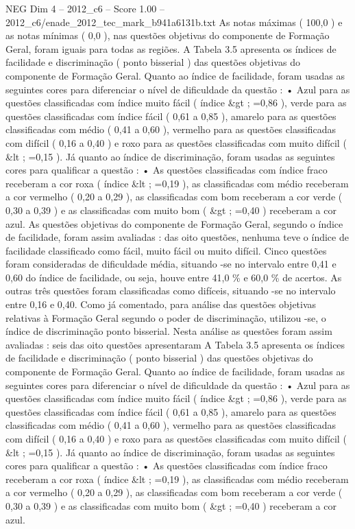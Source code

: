 \begin{textsample}{NEG Dim 4 – 2012\_c6 – Score 1.00 – 2012\_c6/enade\_2012\_tec\_mark\_b941a6131b.txt}
As notas máximas ( 100,0 ) e as notas mínimas ( 0,0 ), nas questões objetivas do componente de Formação Geral, foram iguais para todas as regiões.
A Tabela 3.5 apresenta os índices de facilidade e discriminação ( ponto bisserial ) das questões objetivas do componente de Formação Geral.
Quanto ao índice de facilidade, foram usadas as seguintes cores para diferenciar o nível de dificuldade da questão : • Azul para as questões classificadas com índice muito fácil ( índice \&gt ; =0,86 ), verde para as questões classificadas com índice fácil ( 0,61 a 0,85 ), amarelo para as questões classificadas com médio ( 0,41 a 0,60 ), vermelho para as questões classificadas com difícil ( 0,16 a 0,40 ) e roxo para as questões classificadas com muito difícil ( \&lt ; =0,15 ).
Já quanto ao índice de discriminação, foram usadas as seguintes cores para qualificar a questão : • As questões classificadas com índice fraco receberam a cor roxa ( índice \&lt ; =0,19 ), as classificadas com médio receberam a cor vermelho ( 0,20 a 0,29 ), as classificadas com bom receberam a cor verde ( 0,30 a 0,39 ) e as classificadas com muito bom ( \&gt ; =0,40 ) receberam a cor azul.
As questões objetivas do componente de Formação Geral, segundo o índice de facilidade, foram assim avaliadas : das oito questões, nenhuma teve o índice de facilidade classificado como fácil, muito fácil ou muito difícil.
Cinco questões foram consideradas de dificuldade média, situando -se no intervalo entre 0,41 e 0,60 do índice de facilidade, ou seja, houve entre 41,0 \% e 60,0 \% de acertos.
As outras três questões foram classificadas como difíceis, situando -se no intervalo entre 0,16 e 0,40.
Como já comentado, para análise das questões objetivas relativas à Formação Geral segundo o poder de discriminação, utilizou -se, o índice de discriminação ponto bisserial.
Nesta análise as questões foram assim avaliadas : seis das oito questões apresentaram A Tabela 3.5 apresenta os índices de facilidade e discriminação ( ponto bisserial ) das questões objetivas do componente de Formação Geral.
Quanto ao índice de facilidade, foram usadas as seguintes cores para diferenciar o nível de dificuldade da questão : • Azul para as questões classificadas com índice muito fácil ( índice \&gt ; =0,86 ), verde para as questões classificadas com índice fácil ( 0,61 a 0,85 ), amarelo para as questões classificadas com médio ( 0,41 a 0,60 ), vermelho para as questões classificadas com difícil ( 0,16 a 0,40 ) e roxo para as questões classificadas com muito difícil ( \&lt ; =0,15 ).
Já quanto ao índice de discriminação, foram usadas as seguintes cores para qualificar a questão : • As questões classificadas com índice fraco receberam a cor roxa ( índice \&lt ; =0,19 ), as classificadas com médio receberam a cor vermelho ( 0,20 a 0,29 ), as classificadas com bom receberam a cor verde ( 0,30 a 0,39 ) e as classificadas com muito bom ( \&gt ; =0,40 ) receberam a cor azul.

\end{textsample}
